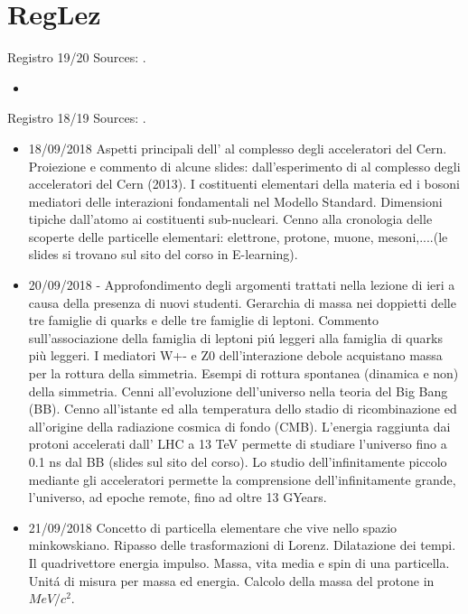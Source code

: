 \section{RegLez}

\begin{frame}[allowframebreaks]{Registro 19/20}
Sources: \cite{reg19}.
\begin{itemize}
\item 
\end{itemize}
\end{frame}

\begin{frame}[allowframebreaks]{Registro 18/19}
Sources: \cite{reg18}.

\listofkeywords

\begin{itemize}
\item 18/09/2018 Aspetti principali dell' al complesso degli acceleratori del Cern. Proiezione e commento di alcune slides: dall'esperimento di  al complesso degli acceleratori del Cern (2013). I costituenti elementari della materia ed i bosoni mediatori delle interazioni fondamentali nel Modello Standard. Dimensioni tipiche dall'atomo ai costituenti sub-nucleari. Cenno alla cronologia delle scoperte delle particelle elementari: elettrone, protone, muone, mesoni,....(le slides si trovano sul sito del corso in E-learning).
\item 20/09/2018 - Approfondimento degli argomenti trattati nella lezione di ieri a causa della presenza di nuovi studenti. Gerarchia di massa nei doppietti delle tre famiglie di quarks e delle tre famiglie di leptoni. Commento sull'associazione della famiglia di leptoni pi\'u leggeri alla famiglia di quarks più leggeri. I mediatori W+- e Z0 dell'interazione debole acquistano massa per la rottura della simmetria. Esempi di rottura spontanea (dinamica e non) della simmetria. Cenni all'evoluzione dell'universo nella teoria del Big Bang (BB). Cenno all'istante ed alla temperatura dello stadio di ricombinazione ed all'origine della radiazione cosmica di fondo (CMB). L'energia raggiunta dai protoni accelerati dall' LHC a 13 TeV permette di studiare l'universo fino a 0.1 ns dal BB (slides sul sito del corso). Lo studio dell'infinitamente piccolo mediante gli acceleratori permette la comprensione dell'infinitamente grande, l'universo, ad epoche remote, fino ad oltre 13 GYears.
\item 21/09/2018 Concetto di particella elementare che vive nello spazio minkowskiano. Ripasso delle trasformazioni di Lorenz. Dilatazione dei tempi. Il quadrivettore energia impulso. Massa, vita media e spin di una particella. Unit\'a di misura per massa ed energia. Calcolo della massa del protone in $MeV/c^2$.

\end{itemize}
\end{frame}
